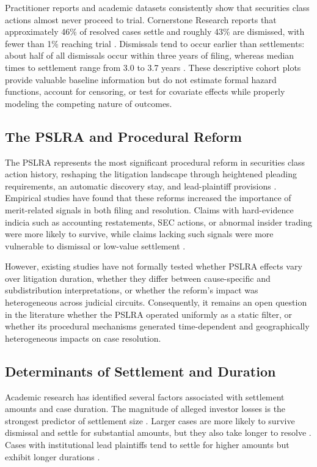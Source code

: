Practitioner reports and academic datasets consistently show
that securities class actions almost never proceed to trial.
Cornerstone Research reports that approximately 46\% of resolved
cases settle and roughly 43\% are dismissed, with fewer than
1\% reaching trial \citep{cornerstone2022}. Dismissals tend to
occur earlier than settlements: about half of all dismissals
occur within three years of filing, whereas median times to
settlement range from 3.0 to 3.7 years \citep{cornerstone2024}.
These descriptive cohort plots provide valuable baseline
information but do not estimate formal hazard functions, account
for censoring, or test for covariate effects while properly
modeling the competing nature of outcomes.

\subsection{The PSLRA and Procedural Reform}

The PSLRA represents the most significant procedural reform in
securities class action history, reshaping the litigation
landscape through heightened pleading requirements, an
automatic discovery stay, and lead-plaintiff provisions
\citep{perino2003, choi2007}. Empirical studies have found
that these reforms increased the importance of merit-related
signals in both filing and resolution. Claims with hard-evidence
indicia such as accounting restatements, SEC actions, or abnormal
insider trading were more likely to survive, while claims lacking
such signals were more vulnerable to dismissal or low-value
settlement \citep{johnson2007, choi2007}.

However, existing studies have not formally tested whether PSLRA 
effects vary over litigation duration, whether they differ between
cause-specific and subdistribution interpretations, or whether
the reform's impact was heterogeneous across judicial circuits.
Consequently, it remains an open question in the literature 
whether the PSLRA operated uniformly as a static filter, or 
whether its procedural mechanisms generated time-dependent and 
geographically heterogeneous impacts on case resolution.

\subsection{Determinants of Settlement and Duration}

Academic research has identified several factors associated
with settlement amounts and case duration. The magnitude of
alleged investor losses is the strongest predictor of
settlement size \citep{cox2008}. Larger cases are more likely
to survive dismissal and settle for substantial amounts, but
they also take longer to resolve \citep{cornerstone2024}.
Cases with institutional lead plaintiffs tend to settle for
higher amounts but exhibit longer durations
\citep{cheng2010, cox2008}.

